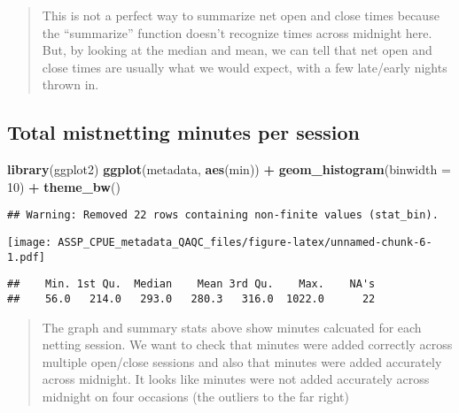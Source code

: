\documentclass[
]{article}
\newenvironment{Shaded}{\begin{snugshade}}{\end{snugshade}}
\newcommand{\CommentTok}[1]{\textcolor[rgb]{0.56,0.35,0.01}{\textit{#1}}}
\newcommand{\DataTypeTok}[1]{\textcolor[rgb]{0.13,0.29,0.53}{#1}}
\newcommand{\DecValTok}[1]{\textcolor[rgb]{0.00,0.00,0.81}{#1}}
\newcommand{\KeywordTok}[1]{\textcolor[rgb]{0.13,0.29,0.53}{\textbf{#1}}}
\newcommand{\NormalTok}[1]{#1}
\newcommand{\OperatorTok}[1]{\textcolor[rgb]{0.81,0.36,0.00}{\textbf{#1}}}
\newcommand{\StringTok}[1]{\textcolor[rgb]{0.31,0.60,0.02}{#1}}
\begin{document}
\begin{quote}
This is not a perfect way to summarize net open and close times because
the ``summarize'' function doesn't recognize times across midnight here.
But, by looking at the median and mean, we can tell that net open and
close times are usually what we would expect, with a few late/early
nights thrown in.
\end{quote}

\hypertarget{total-mistnetting-minutes-per-session}{%
\subsection{Total mistnetting minutes per
session}\label{total-mistnetting-minutes-per-session}}

\begin{Shaded}
\begin{Highlighting}[]
\KeywordTok{library}\NormalTok{(ggplot2)}
\KeywordTok{ggplot}\NormalTok{(metadata, }\KeywordTok{aes}\NormalTok{(min)) }\OperatorTok{+}
\StringTok{  }\KeywordTok{geom_histogram}\NormalTok{(}\DataTypeTok{binwidth =} \DecValTok{10}\NormalTok{) }\OperatorTok{+}
\StringTok{  }\KeywordTok{theme_bw}\NormalTok{()}
\end{Highlighting}
\end{Shaded}

\begin{verbatim}
## Warning: Removed 22 rows containing non-finite values (stat_bin).
\end{verbatim}

\texttt{[image: ASSP\_CPUE\_metadata\_QAQC\_files/figure-latex/unnamed-chunk-6-1.pdf]}

\begin{Shaded}
\end{Shaded}

\begin{verbatim}
##    Min. 1st Qu.  Median    Mean 3rd Qu.    Max.    NA's 
##    56.0   214.0   293.0   280.3   316.0  1022.0      22
\end{verbatim}

\begin{quote}
The graph and summary stats above show minutes calcuated for each
netting session. We want to check that minutes were added correctly
across multiple open/close sessions and also that minutes were added
accurately across midnight. It looks like minutes were not added
accurately across midnight on four occasions (the outliers to the far
right)
\end{quote}
\end{document}
